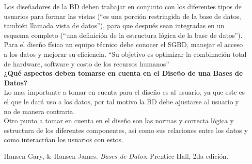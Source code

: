 \documentclass[spanish,12pt,letterpapper]{article}
\begin{document}
	Los diseñadores de la BD deben trabajar en conjunto con los diferentes tipos de usuarios para formar las vistas (``es una porción restringida de la base de datos, también llamada vista de datos''), para que después sean integradas en un esquema completo (``una definición de la estructura lógica de la base de datos''). \\
	
	Para el diseño físico un equipo técnico debe conocer el SGBD, manejar el acceso a los datos y mejorar su eficiencia. ``Su objetivo es optimizar la combinación total de hardware, software y costo de los recursos humanos''\\
	
	\textbf{¿Qué aspectos deben tomarse en cuenta en el Diseño de una Bases de Datos?\\}
	Lo mas importante a tomar en cuenta para el diseño es al usuario, ya que este es el que le dará uso a los datos, por tal motivo la BD debe ajustarse al usuario y no de manera contraria.\\
	
	Otro punto a tomar en cuenta en el diseño son las normas y correcta lógica y estructura de los diferentes componentes, asi como sus relaciones entre los datos y como interactúan los usuarios con estos. 
	
	\pagebreak
	\begin{thebibliography}{9}
		 Hansen Gary, \& Hansen James. 
		\emph{Bases de Datos}. Prentice Hall, 2da edición.
	\end{thebibliography}
\end{document}
